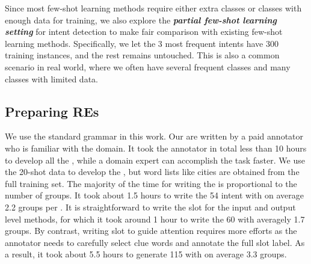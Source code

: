 Since most few-shot learning methods require either extra classes or classes with enough data for training, we also explore the
\textbf{\emph{partial few-shot learning setting}} for intent detection to make fair comparison with existing few-shot learning methods.
Specifically, we let the 3 most frequent intents have 300 training instances, and the rest remains untouched.
This is also a common scenario in real world, where we often have several frequent classes and many classes with limited data.

\subsection{Preparing REs}
\label{re_in_exp} We use the standard \RE grammar in this work. Our \REs are written by a paid annotator 
who is familiar with the domain.
It took the annotator in total less than 10 hours
to develop all the \REs, while a domain expert can accomplish the task faster. We use the 20-shot data to develop the \REs, but word lists
like cities are obtained from the full training set. The majority of the time 
for %
writing the \REs is proportional to the number of \RE groups. 
It took about 1.5 hours to write the 54 intent \REs with on average 2.2 groups per \RE. It is straightforward
to write the slot \REs for the input and output level methods, for which it took around
 1 hour to write the 60 \REs with averagely 1.7 groups. By contrast, writing slot \REs to guide attention requires more
efforts as the annotator needs to carefully select clue words and annotate the full slot label. As a result, it took about 
5.5 hours to generate 115 \REs with on average 3.3 groups.


